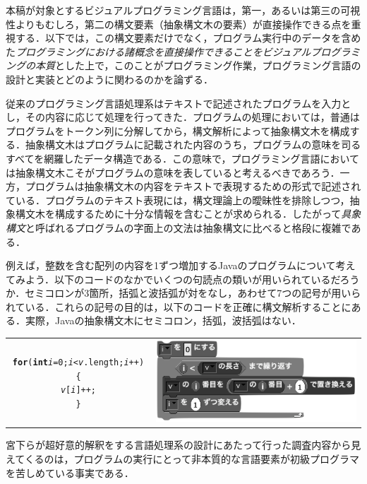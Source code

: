 \documentclass [11pt] {jsarticle}
\newcommand\var[1]{\textrm {\textit {#1}}}
\newcommand\rsv[1]{\textrm {\textbf {#1}}}
\newcommand\mth[1]{\textrm {\textsf {#1}}}
\begin{document}
本稿が対象とするビジュアルプログラミング言語は，第一，あるいは第三の可視性よりもむしろ，第二の構文要素（抽象構文木の要素）が直接操作できる点を重視する．以下では，この構文要素だけでなく，プログラム実行中のデータを含めた\emph {プログラミングにおける諸概念を直接操作できることをビジュアルプログラミングの本質}とした上で，このことがプログラミング作業，プログラミング言語の設計と実装とどのように関わるのかを論ずる．

従来のプログラミング言語処理系はテキストで記述されたプログラムを入力とし，その内容に応じて処理を行ってきた．プログラムの処理においては，普通はプログラムをトークン列に分解してから，構文解析によって抽象構文木を構成する．抽象構文木はプログラムに記載された内容のうち，プログラムの意味を司るすべてを網羅したデータ構造である．この意味で，プログラミング言語においては抽象構文木こそがプログラムの意味を表していると考えるべきであろう．一方，プログラムは抽象構文木の内容をテキストで表現するための形式で記述されている．プログラムのテキスト表現には，構文理論上の曖昧性を排除しつつ，抽象構文木を構成するために十分な情報を含むことが求められる．したがって\emph {具象構文}と呼ばれるプログラムの字面上の文法は抽象構文に比べると格段に複雑である．

例えば，整数を含む配列の内容を1ずつ増加するJavaのプログラムについて考えてみよう．以下のコードのなかでいくつの句読点の類いが用いられているだろうか．セミコロンが3箇所，括弧と波括弧が対をなし，あわせて7つの記号が用いられている．これらの記号の目的は，以下のコードを正確に構文解析することにある．実際，Javaの抽象構文木にセミコロン，括弧，波括弧はない．\bigskip

\begin {tabular}{cc}
\begin {minipage}[b]{.48\linewidth}
\begin{alltt}
\rsv{for} (\rsv{int} \var{i} = 0; \var{i} < \var{v}.\mth{length}; \var{i}++) \{
    \var{v}[\var{i}]++;
\}

\end{alltt}
\end {minipage} &
\includegraphics [width=.45\linewidth] {figs/scratch-scan-array.png}
\end {tabular}\bigskip

宮下らが超好意的解釈をする言語処理系\cite{Nakahashi10HMMMML2}の設計にあたって行った調査内容から見えてくるのは，プログラムの実行にとって非本質的な言語要素が初級プログラマを苦しめている事実である．
\end{document}
